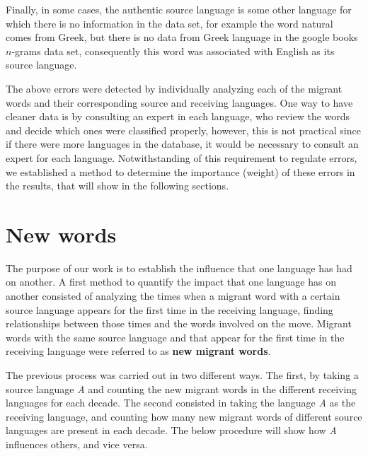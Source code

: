 \documentclass[10pt,letterpaper]{article} %
\begin{document}
 Finally, in some cases, the authentic source language is some other language for which there is no information in the data set, for example the word  natural comes from Greek, but there is no data from Greek language in the google books $n$-grams data set, consequently this word was associated with English as its source language.

The above errors were detected by individually analyzing each of the migrant words and their corresponding source and receiving languages. One way to have cleaner data is by consulting an expert in each language, who review the words and decide which ones were classified properly, however, this is not practical since if there were more languages in the database, it would be necessary to consult an expert for each language. Notwithstanding of this requirement to  regulate errors, we established a method to determine the importance (weight) of these errors in the results, that will show in the following sections. 

\section*{New words} %
The purpose of our work is to establish the influence that one
language has had on another.
A first method to quantify the impact
that one language has on another consisted of analyzing the
times when a migrant word with a certain source language appears for the first
time in the receiving language, finding relationships between those times and
the words involved on the move. Migrant words with the same source language and
that appear for the first time in the receiving language were referred to as
\textbf{new migrant words}. 

The previous process was carried out in two different ways. The first, by
taking a source language \textit{A} and counting the new migrant words in the
different receiving languages for each decade. The second consisted in taking
the language \textit{A} as the receiving language, and counting how many new
migrant words of different source languages are present in each decade. The
below procedure will show how \textit{A} influences others, and vice versa.


\end{document}
